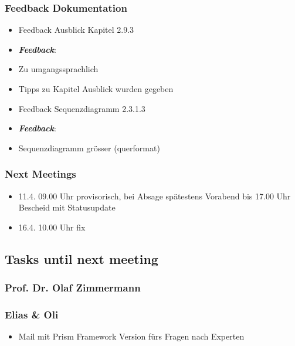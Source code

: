 \hypertarget{feedback-dokumentation}{%
\subsubsection*{Feedback Dokumentation}\label{feedback-dokumentation}}

\begin{itemize}
\item Feedback Ausblick Kapitel 2.9.3 
\item \emph{\textbf{Feedback}}:
\item Zu umgangssprachlich
\item Tipps zu Kapitel Ausblick wurden gegeben
\item Feedback Sequenzdiagramm 2.3.1.3
\item \emph{\textbf{Feedback}}:
\item Sequenzdiagramm grösser (querformat)
\end{itemize}

\hypertarget{next-meetings}{%
\subsubsection*{Next Meetings}\label{next-meetings}}

\begin{itemize}

\item
  11.4. 09.00 Uhr provisorisch, bei Absage spätestens Vorabend bis 17.00 Uhr Bescheid mit Statusupdate
\item
  16.4. 10.00 Uhr fix
\end{itemize}

\hypertarget{tasks-until-next-meeting}{%
\subsection*{Tasks until next meeting}\label{tasks-until-next-meeting}}

\hypertarget{prof-dr-olaf-zimmermann}{%
\subsubsection*{Prof. Dr. Olaf
Zimmermann}\label{prof-dr-olaf-zimmermann}}

\hypertarget{elias--oli}{%
\subsubsection*{Elias \& Oli}\label{elias--oli}}

\begin{itemize}
\item Mail mit Prism Framework Version fürs Fragen nach Experten
\end{itemize}
